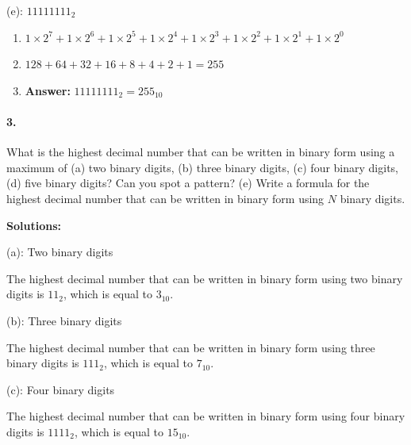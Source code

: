 \documentclass{article}
\begin{document}
\vspace*{0.5cm}

\noindent (e): $11111111_2$

\begin{enumerate}
    \item $1 \times 2^7 + 1 \times 2^6 + 1 \times 2^5 + 1 \times 2^4 + 1 \times 2^3 + 1 \times 2^2 + 1 \times 2^1 + 1 \times 2^0$
    \item $128 + 64 + 32 + 16 + 8 + 4 + 2 + 1 = 255$
    \item \textbf{Answer:} $11111111_2 = 255_{10}$
\end{enumerate}

\newpage

\paragraph*{3.}
What is the highest decimal number that can be written in binary form using a maximum of (a) two binary digits, 
(b) three binary digits, (c) four binary digits, (d) five binary digits? Can you spot a pattern? (e) Write a formula for 
the highest decimal number that can be written in binary form using $N$ binary digits.

\vspace*{0.5cm}

\noindent \textbf{Solutions:}

\vspace*{0.25cm}

\noindent (a): Two binary digits

\vspace*{0.25cm}

\noindent The highest decimal number that can be written in binary form using two binary digits is $11_2$, which is equal to $3_{10}$.

\vspace*{0.5cm}

\noindent (b): Three binary digits

\vspace*{0.25cm}

\noindent The highest decimal number that can be written in binary form using three binary digits is $111_2$, which is equal to $7_{10}$.

\vspace*{0.5cm}

\noindent (c): Four binary digits

\vspace*{0.25cm}

\noindent The highest decimal number that can be written in binary form using four binary digits is $1111_2$, which is equal to $15_{10}$.
\end{document}
